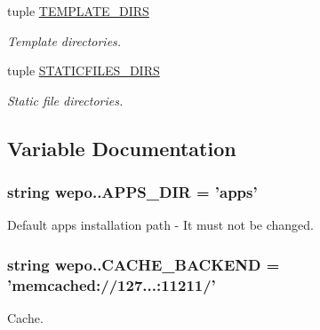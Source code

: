 \begin{DoxyCompactItemize}
tuple \hyperlink{namespacewepo_1_1_ac24150b1d9b1462d35d17c14ba54b52c}{T\-E\-M\-P\-L\-A\-T\-E\-\_\-\-D\-I\-R\-S}
\begin{DoxyCompactList}\small\item\em Template directories. \end{DoxyCompactList}\item 
tuple \hyperlink{namespacewepo_1_1_a7f1f392a4d1538e3761d4d0395268df4}{S\-T\-A\-T\-I\-C\-F\-I\-L\-E\-S\-\_\-\-D\-I\-R\-S}
\begin{DoxyCompactList}\small\item\em Static file directories. \end{DoxyCompactList}\end{DoxyCompactItemize}


\subsection{Variable Documentation}
\hypertarget{namespacewepo_1_1_a4a23b03339977207601d1c5af5129b8e}{
\subsubsection[{A\-P\-P\-S\-\_\-\-D\-I\-R}]{\setlength{\rightskip}{0pt plus 5cm}string wepo..\-A\-P\-P\-S\-\_\-\-D\-I\-R = 'apps'}}\label{namespacewepo_1_1_a4a23b03339977207601d1c5af5129b8e}


Default apps installation path -\/ It must not be changed. 

\hypertarget{namespacewepo_1_1_a0c59bb49e79b82d0929a67f3613ee05e}{
\subsubsection[{C\-A\-C\-H\-E\-\_\-\-B\-A\-C\-K\-E\-N\-D}]{\setlength{\rightskip}{0pt plus 5cm}string wepo..\-C\-A\-C\-H\-E\-\_\-\-B\-A\-C\-K\-E\-N\-D = 'memcached\-://127...\-:11211/'}}\label{namespacewepo_1_1_a0c59bb49e79b82d0929a67f3613ee05e}


Cache. 

